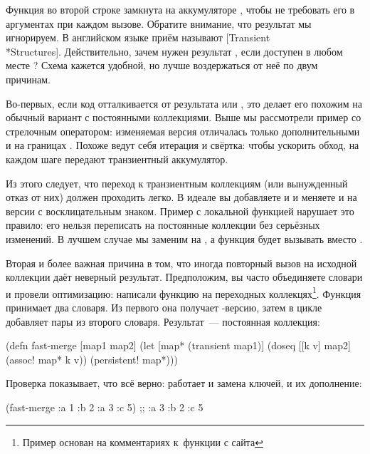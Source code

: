 Функция  во второй строке замкнута на аккумуляторе , чтобы не
требовать его в аргументах при каждом вызове. Обратите внимание, что результат
 мы игнорируем. В английском языке приём называют
[Transient\\*Structures].
Действительно, зачем нужен результат , если  доступен
в любом месте ? Схема кажется удобной, но лучше воздержаться
от неё по двум причинам.

Во-первых, если код отталкивается от результата  или ,
это делает его похожим на обычный вариант с постоянными коллекциями. Выше мы
рассмотрели пример со стрелочным оператором: изменяемая версия отличалась только
дополнительными  и  на
границах . Похоже ведут себя итерация и свёртка: чтобы
ускорить обход, на каждом шаге передают транзиентный аккумулятор.

Из этого следует, что переход к транзиентным коллекциям (или вынужденный отказ
от них) должен проходить легко. В идеале вы добавляете  и
 и меняете  и  на версии с
восклицательным знаком. Пример с локальной функцией  нарушает это
правило: его нельзя переписать на постоянные коллекции без серьёзных
изменений. В лучшем случае мы заменим  на , а функция
 будет вызывать  вместо .

Вторая и более важная причина в том, что иногда повторный вызов  на
исходной коллекции даёт неверный результат. Предположим, вы часто объединяете
словари и провели оптимизацию: написали функцию  на переходных
коллекцях\footnote{Пример основан на комментариях к~функции  с
  сайта }. Функция принимает два словаря. Из
первого она получает -версию, затем в цикле добавляет пары из
второго словаря. Результат~--- постоянная коллекция:

\begin{clojure}
(defn fast-merge [map1 map2]
  (let [map* (transient map1)]
    (doseq [[k v] map2]
      (assoc! map* k v))
    (persistent! map*)))
\end{clojure}

Проверка показывает, что всё верно: работает и замена ключей, и их дополнение:

\begin{clojure}
(fast-merge {:a 1 :b 2} {:a 3 :c 5})
;; {:a 3 :b 2 :c 5}
\end{clojure}

